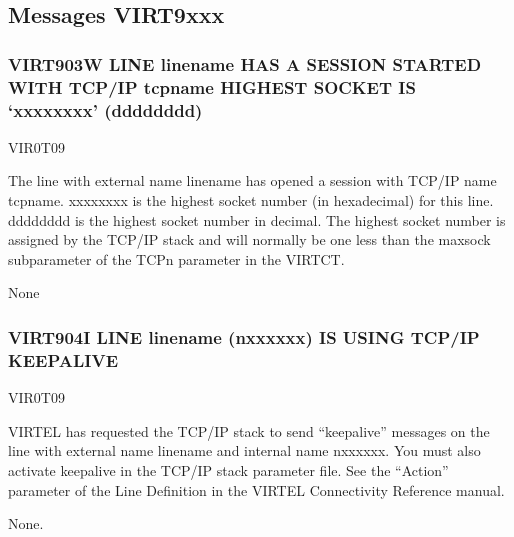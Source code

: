 \documentclass[letterpaper,10pt,english]{sphinxmanual}
\begin{document}
\subsection{Messages VIRT9xxx}
\label{\detokenize{messages:messages-virt9xxx}}

\subsubsection{VIRT903W LINE linename HAS A SESSION STARTED WITH TCP/IP tcpname HIGHEST SOCKET IS ‘xxxxxxxx’ (dddddddd)}
\label{\detokenize{messages:virt903w-line-linename-has-a-session-started-with-tcp-ip-tcpname-highest-socket-is-xxxxxxxx-dddddddd}}\begin{description}
\sphinxAtStartPar
VIR0T09

\sphinxAtStartPar
The line with external name linename has opened a session with TCP/IP name tcpname. xxxxxxxx is the highest socket number (in hexadecimal) for this line. dddddddd is the highest socket number in decimal. The highest socket number is assigned by the TCP/IP stack and will normally be one less than the maxsock subparameter of the TCPn parameter in the VIRTCT.

\sphinxAtStartPar
None

\end{description}


\subsubsection{VIRT904I LINE linename (n\sphinxhyphen{}xxxxxx) IS USING TCP/IP KEEPALIVE}
\label{\detokenize{messages:virt904i-line-linename-n-xxxxxx-is-using-tcp-ip-keepalive}}\begin{description}
\sphinxAtStartPar
VIR0T09

\sphinxAtStartPar
VIRTEL has requested the TCP/IP  stack to send “keepalive” messages on the line with external name linename and internal name n\sphinxhyphen{}xxxxxx. You must also activate keepalive in the TCP/IP stack parameter file. See the “Action” parameter of the Line Definition in the VIRTEL Connectivity Reference manual.

\sphinxAtStartPar
None.

\end{description}
\end{document}
